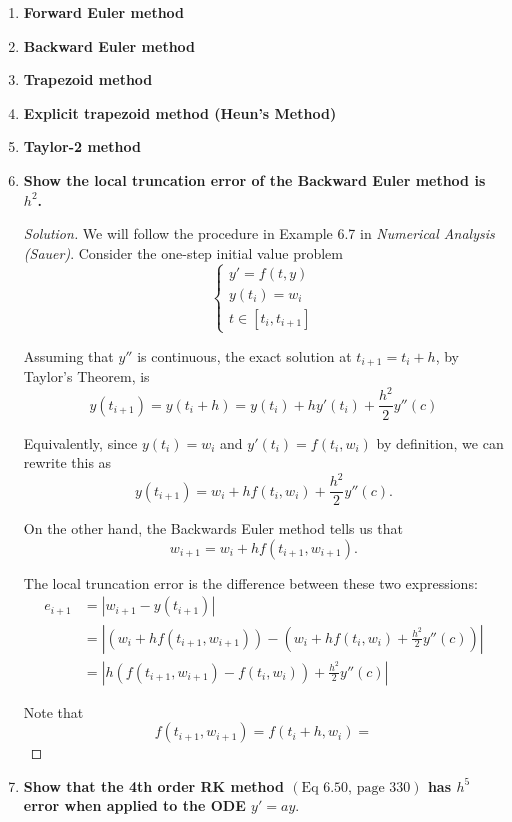 \documentclass[11pt]{article}
\newenvironment{solution}
  {\renewcommand\qedsymbol{$\blacksquare$}\begin{proof}[Solution]}
  {\end{proof}}
\theoremstyle{definition}
\begin{document}
\begin{enumerate}
    \item \textbf{Forward Euler method}
    \item \textbf{Backward Euler method}
    \item \textbf{Trapezoid method}
    \item \textbf{Explicit trapezoid method (Heun's Method)}
    \item \textbf{Taylor-2 method}
    
    \newpage

    \item \textbf{Show the local truncation error of the Backward Euler method is $h^2$.}
    
    \begin{solution}

    We will follow the procedure in Example 6.7 in \textit{Numerical Analysis (Sauer)}.
    Consider the one-step initial value problem
    \[\begin{cases}
        y' = f(t, y) \\
        y(t_i)=w_i \\
        t \in [t_i,t_{i+1}]
    \end{cases}\]


    Assuming that $y''$ is continuous, the exact solution at $t_{i+1} = t_i + h$, by Taylor's Theorem, is
    \[ y(t_{i+1}) = y(t_i + h) = y(t_i) + hy'(t_i) + \frac{h^2}{2}y''(c) \]

    Equivalently, since $y(t_i) = w_i$ and $y'(t_i) = f(t_i, w_i)$ by definition, we can rewrite this as
    \[ y(t_{i+1}) =  w_i + hf(t_i, w_i) + \frac{h^2}{2}y''(c).\]

    On the other hand, the Backwards Euler method tells us that \[w_{i+1}= w_i + hf(t_{i+1}, w_{i+1}).\]

    The local truncation error is the difference between these two expressions:
    \begin{align*} e_{i+1} &= |w_{i+1} - y(t_{i+1})|  \\
        &= \left|\left( w_i + hf(t_{i+1}, w_{i+1}) \right) - \left( w_i + hf(t_i, w_i) + \frac{h^2}{2}y''(c)\right) \right| \\
        &= \left| h(f(t_{i+1}, w_{i+1}) - f(t_i, w_i)) + \frac{h^2}{2}y''(c)\right|
    \end{align*}
        
    Note that 
    \[ f(t_{i+1}, w_{i+1}) = f(t_i + h, w_i ) = \]
    \end{solution}
    \item \textbf{Show that the 4th order RK method $(\text{Eq } 6.50, \, \text{page } 330)$ has $h^5$ error when applied to the ODE $y'=ay.$}
\end{enumerate}
\end{document}
